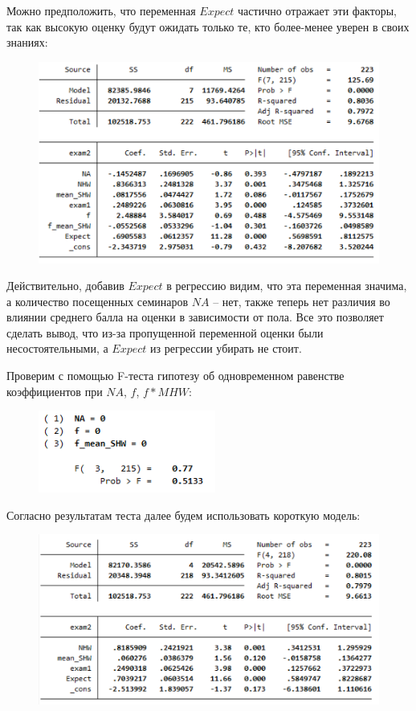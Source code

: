 \documentclass[12pt,a4paper, oneside]{extreport}
\begin{document}
Можно предположить, что переменная $Expect$ частично отражает эти факторы, так как высокую оценку будут ожидать только те, кто более-менее уверен в своих знаниях: 

\begin{figure}[h!]
	\centering
	\includegraphics[width=0.7\linewidth]{screenshot002}
	\label{fig:screenshot002}
\end{figure}



Действительно, добавив $Expect$ в регрессию видим, что эта переменная значима, а количество посещенных семинаров $NA$ -- нет, также теперь нет различия во влиянии среднего балла на оценки в зависимости от пола. Все это позволяет сделать вывод,  что из-за пропущенной переменной оценки были несостоятельными, а $Expect$ из регрессии убирать не стоит.

Проверим с помощью F-теста гипотезу об одновременном равенстве коэффициентов при $NA$, $f$, $f*MHW$:

\begin{figure}[h!]
	\centering
	\includegraphics{screenshot003}
	\label{fig:screenshot003}
\end{figure}

Согласно результатам теста далее будем использовать короткую модель:

\begin{figure}[h!]
	\centering
	\includegraphics[width=0.7\linewidth]{screenshot004}
	\label{fig:screenshot004}
\end{figure}
\end{document}
